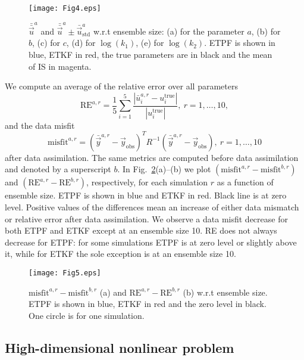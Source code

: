 \documentclass[12, a4paper]{article}
\numberwithin{equation}{section}
\begin{document}
\begin{figure} [t]
	\centering		
	\texttt{[image: Fig4.eps]}	
	\caption{${\bar{\bar{\vec{u}}}}^a$ and ${\bar{\bar{\vec{u}}}}^a \pm {\bar{\vec{u}}^a_\textrm{std}}$ w.r.t 
		ensemble size: (a) for the parameter $a$, (b) for $b$, (c) for $c$, (d) for $\log(k_1)$, (e) for $\log(k_2)$. 
		ETPF is shown in blue,  ETKF in red, the true parameters are in black and the mean of IS in magenta.}	
	\label{Fig_5Dpar}
\end{figure}  

We compute an average of the relative error over all parameters
\begin{equation*} 
\text{RE}^{a,r}  =\frac{1}{5}\sum_{i=1}^5
\frac{|\bar{u}_i^{a,r}-u_i^\textrm{true}|}{|u_i^\textrm{true}|}, \  r=1,\hdots,10,
\end{equation*} 
and the data misfit
\begin{equation}  \label{misfitar}
\text{misfit}^{a,r}  = (\bar{\vec{y}}^{a,r} - \vec{y}_\text{obs})^TR^{-1}(\bar{\vec{y}}^{a,r} - \vec{y}_\text{obs}), \  r=1,\hdots,10
\end{equation}
after data assimilation. The same metrics are computed before data assimilation and denoted by a superscript $b$. In Fig.~\ref{Fig_5Dchange}(a)--(b) we plot $(\text{misfit}^{a,r}- \text{misfit}^{b,r})$ and $(\text{RE}^{a,r}-\text{RE}^{b,r})$, respectively, for each simulation $r$ as a function of ensemble size. ETPF is shown in blue and ETKF in red. Black line is at zero level. Positive values of the differences mean an increase of either data mismatch or relative error after data assimilation. We observe a data misfit decrease for both ETPF and ETKF except at an ensemble size 10. RE does not always decrease for ETPF: for some simulations ETPF is at zero level or slightly above it, while for ETKF the sole exception is at an ensemble size 10.
\begin{figure} [t]
	\centering		
	\texttt{[image: Fig5.eps]}	
	\caption{$\text{misfit}^{a,r}- \text{misfit}^{b,r}$ (a) and $\text{RE}^{a,r}-\text{RE}^{b,r}$ (b) w.r.t ensemble size. ETPF is shown in blue, ETKF in red and the zero level in black. One circle is for one simulation.}	
	\label{Fig_5Dchange}
\end{figure}  

\subsection{High-dimensional nonlinear problem}
\end{document}
